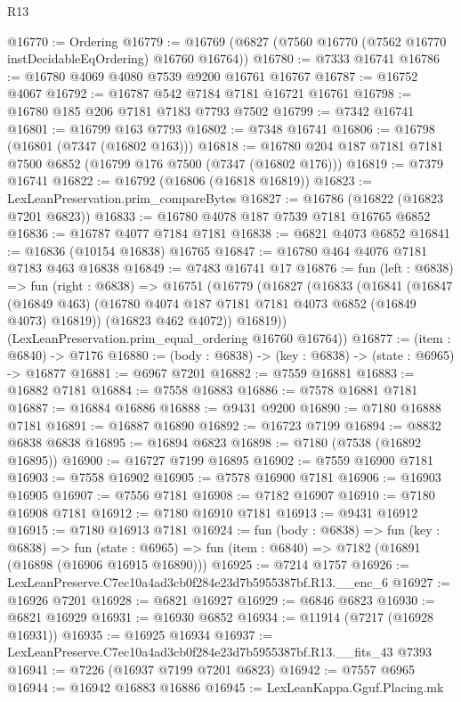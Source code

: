 \begin{lexlean}{R13}
\begin{coremodule}
@16770 := Ordering
@16779 := @16769 (@6827 (@7560 @16770 (@7562 @16770 instDecidableEqOrdering) @16760 @16764))
@16780 := @7333 @16741
@16786 := @16780 @4069 @4080 @7539 @9200 @16761 @16767
@16787 := @16752 @4067
@16792 := @16787 @542 @7184 @7181 @16721 @16761
@16798 := @16780 @185 @206 @7181 @7183 @7793 @7502
@16799 := @7342 @16741
@16801 := @16799 @163 @7793
@16802 := @7348 @16741
@16806 := @16798 (@16801 (@7347 (@16802 @163)))
@16818 := @16780 @204 @187 @7181 @7181 @7500 @6852 (@16799 @176 @7500 (@7347 (@16802 @176)))
@16819 := @7379 @16741
@16822 := @16792 (@16806 (@16818 @16819))
@16823 := LexLeanPreservation.prim_compareBytes
@16827 := @16786 (@16822 (@16823 @7201 @6823))
@16833 := @16780 @4078 @187 @7539 @7181 @16765 @6852
@16836 := @16787 @4077 @7184 @7181
@16838 := @6821 @4073 @6852
@16841 := @16836 (@10154 @16838) @16765
@16847 := @16780 @464 @4076 @7181 @7183 @463 @16838
@16849 := @7483 @16741 @17
@16876 := fun (left : @6838) =>
  fun (right : @6838) =>
  @16751
    (@16779
      (@16827
        (@16833
          (@16841
            (@16847 (@16849 @463) (@16780 @4074 @187 @7181 @7181 @4073 @6852 (@16849 @4073) @16819))
            (@16823 @462 @4072))
          @16819))
      (LexLeanPreservation.prim_equal_ordering @16760 @16764))
@16877 := (item : @6840) -> @7176
@16880 := (body : @6838) -> (key : @6838) -> (state : @6965) -> @16877
@16881 := @6967 @7201
@16882 := @7559 @16881
@16883 := @16882 @7181
@16884 := @7558 @16883
@16886 := @7578 @16881 @7181
@16887 := @16884 @16886
@16888 := @9431 @9200
@16890 := @7180 @16888 @7181
@16891 := @16887 @16890
@16892 := @16723 @7199
@16894 := @8832 @6838 @6838
@16895 := @16894 @6823
@16898 := @7180 (@7538 (@16892 @16895))
@16900 := @16727 @7199 @16895
@16902 := @7559 @16900 @7181
@16903 := @7558 @16902
@16905 := @7578 @16900 @7181
@16906 := @16903 @16905
@16907 := @7556 @7181
@16908 := @7182 @16907
@16910 := @7180 @16908 @7181
@16912 := @7180 @16910 @7181
@16913 := @9431 @16912
@16915 := @7180 @16913 @7181
@16924 := fun (body : @6838) =>
  fun (key : @6838) =>
  fun (state : @6965) => fun (item : @6840) => @7182 (@16891 (@16898 (@16906 @16915 @16890)))
@16925 := @7214 @1757
@16926 := LexLeanPreserve.C7ec10a4ad3cb0f284e23d7b5955387bf.R13.__enc_6
@16927 := @16926 @7201
@16928 := @6821 @16927
@16929 := @6846 @6823
@16930 := @6821 @16929
@16931 := @16930 @6852
@16934 := @11914 (@7217 (@16928 @16931))
@16935 := @16925 @16934
@16937 := LexLeanPreserve.C7ec10a4ad3cb0f284e23d7b5955387bf.R13.__fits_43 @7393
@16941 := @7226 (@16937 @7199 @7201 @6823)
@16942 := @7557 @6965
@16944 := @16942 @16883 @16886
@16945 := LexLeanKappa.Gguf.Placing.mk

\end{coremodule}
\end{lexlean}
